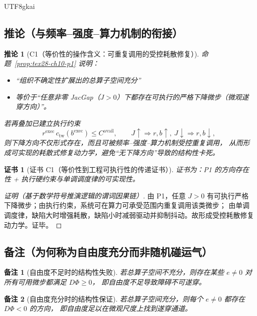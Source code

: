\documentclass[12pt]{article}
\newtheorem{corollary}{推论}[section]
\newtheorem{remark}{备注}[section]
\newtheorem{Certificate}{证书}[section]
\begin{document}
\begin{CJK*}{UTF8}{gkai}
\subsection{推论（与频率--强度--算力机制的衔接）}
\label{subsec:tex28-ch10-corollaries}

\begin{corollary}[C1（等价性的操作含义：可重复调用的受控耗散修复）]
\label{cor:tex28-ch10-c1}
命题~\ref{prop:tex28-ch10-p1} 说明：
\begin{itemize}
  \item “组织不确定性扩展出的总算子空间充分”
  \item 等价于“任意非零 JacGap（$J>0$）下都存在可执行的严格下降微步（微观遂穿方向）”。
\end{itemize}
若再叠加已建立执行约束
\[
  r^{\mathrm{exec}}\,c_{\mathrm{tw}}(b^{\mathrm{exec}})\le C^{\mathrm{avail}},
  \qquad
  J\uparrow\Rightarrow r,b\uparrow,\
  J\downarrow\Rightarrow r,b\downarrow,
\]
则下降方向不仅形式存在，而且可被频率--强度--算力机制受控重复调用，
从而形成可实现的耗散式修复动力学，避免“无下降方向”导致的结构性卡死。
\end{corollary}

\begin{Certificate}[证书 C1（等价性到工程可执行性的传递证书）]
\label{cert:tex28-ch10-c1}
证书为：P1 的方向存在性 + 执行硬约束与单调调度律的可实现性。
\end{Certificate}

\begin{proof}[证明（基于数学符号推演逻辑的谓词因果链）]
由 P1，任意 $J>0$ 有可执行严格下降微步；由执行约束，系统可在算力可承受范围内重复调用该类微步；
由单调调度律，缺陷大时增强耗散，缺陷小时减弱驱动并抑制抖动。故形成受控耗散修复动力学。证毕。
\end{proof}

\subsection{备注（为何称为自由度充分而非随机碰运气）}
\label{subsec:tex28-ch10-remarks}

\begin{remark}[自由度不足时的结构性失败]
若总算子空间不充分，则存在某些 $e\neq0$ 对所有可用微步都满足 $D\Phi\ge0$，
即自由度不足导致障碍不可遂穿。
\end{remark}

\begin{remark}[自由度充分时的结构性保证]
若总算子空间充分，则每个 $e\neq0$ 都存在 $D\Phi<0$ 的方向，
即自由度足以在微观尺度上找到遂穿通道。
\end{remark}


\end{CJK*}
\end{document}
